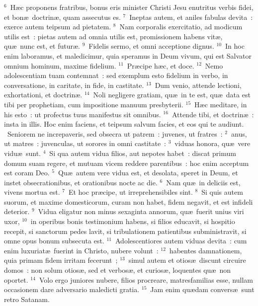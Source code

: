 ${}^{6}$~H\ae c proponens fratribus, bonus eris minister Christi Jesu enutritus verbis fidei, et bon\ae\ doctrin\ae , quam assecutus es.
${}^{7}$~Ineptas autem, et aniles fabulas devita~: exerce autem teipsum ad pietatem.
${}^{8}$~Nam corporalis exercitatio, ad modicum utilis est~: pietas autem ad omnia utilis est, promissionem habens vit\ae , qu\ae\ nunc est, et futur\ae .
${}^{9}$~Fidelis sermo, et omni acceptione dignus.
${}^{10}$~In hoc enim laboramus, et maledicimur, quia speramus in Deum vivum, qui est Salvator omnium hominum, maxime fidelium.
${}^{11}$~Pr\ae cipe h\ae c, et doce.
${}^{12}$~Nemo adolescentiam tuam contemnat~: sed exemplum esto fidelium in verbo, in conversatione, in caritate, in fide, in castitate.
${}^{13}$~Dum venio, attende lectioni, exhortationi, et doctrin\ae .
${}^{14}$~Noli negligere gratiam, qu\ae\ in te est, qu\ae\ data est tibi per prophetiam, cum impositione manuum presbyterii.
${}^{15}$~H\ae c meditare, in his esto~: ut profectus tuus manifestus sit omnibus.
${}^{16}$~Attende tibi, et doctrin\ae~: insta in illis. Hoc enim faciens, et teipsum salvum facies, et eos qui te audiunt.
~Seniorem ne increpaveris, sed obsecra ut patrem~: juvenes, ut fratres~:
${}^{2}$~anus, ut matres~: juvenculas, ut sorores in omni castitate~:
${}^{3}$~viduas honora, qu\ae\ vere vidu\ae\ sunt.
${}^{4}$~Si qua autem vidua filios, aut nepotes habet~: discat primum domum suam regere, et mutuam vicem reddere parentibus~: hoc enim acceptum est coram Deo.
${}^{5}$~Qu\ae\ autem vere vidua est, et desolata, speret in Deum, et instet obsecrationibus, et orationibus nocte ac die.
${}^{6}$~Nam qu\ae\ in deliciis est, vivens mortua est.
${}^{7}$~Et hoc pr\ae cipe, ut irreprehensibiles sint.
${}^{8}$~Si quis autem suorum, et maxime domesticorum, curam non habet, fidem negavit, et est infideli deterior.
${}^{9}$~Vidua eligatur non minus sexaginta annorum, qu\ae\ fuerit unius viri uxor,
${}^{10}$~in operibus bonis testimonium habens, si filios educavit, si hospitio recepit, si sanctorum pedes lavit, si tribulationem patientibus subministravit, si omne opus bonum subsecuta est.
${}^{11}$~Adolescentiores autem viduas devita~: cum enim luxuriat\ae\ fuerint in Christo, nubere volunt~:
${}^{12}$~habentes damnationem, quia primam fidem irritam fecerunt~;
${}^{13}$~simul autem et otios\ae\ discunt circuire domos~: non solum otios\ae , sed et verbos\ae , et curios\ae , loquentes qu\ae\ non oportet.
${}^{14}$~Volo ergo juniores nubere, filios procreare, matresfamilias esse, nullam occasionem dare adversario maledicti gratia.
${}^{15}$~Jam enim qu\ae dam convers\ae\ sunt retro Satanam.
